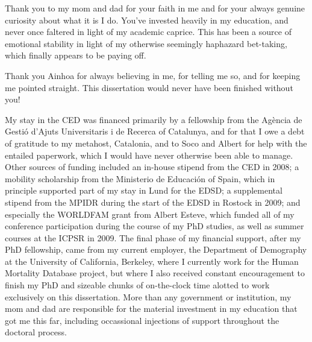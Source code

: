 Thank you to my mom and dad for your faith in me and for your always genuine
curiosity about what it is I do. You've invested heavily in my education, and never once
faltered in light of my academic caprice. This has been a source of emotional
stability in light of my otherwise seemingly haphazard bet-taking, which finally
appears to be paying off.

Thank you Ainhoa for always believing in me, for telling me so, and for keeping
me pointed straight. This dissertation would never have been finished without
you!

My stay in the CED was financed primarily by a
fellowship from the Ag\`{e}ncia de Gesti\'{o} d'Ajuts Universitaris i de Recerca
of Catalunya, and for that I owe a debt of gratitude to my metahost, Catalonia,
and to Soco and Albert for help with the entailed paperwork, which I
would have never otherwise been able to manage. Other sources of funding
included an in-house stipend from the CED in 2008; a mobility scholarship 
from the Ministerio de Educaci\'{o}n of Spain, which in principle supported 
part of my stay in Lund for the EDSD; a supplemental stipend from the
MPIDR during the start of the EDSD in Rostock in 2009; and especially the
WORLDFAM grant from Albert Esteve, which funded all of my conference
participation during the course of my PhD studies, as well as summer courses at
the ICPSR in 2009. The final phase of my financial support, after my PhD fellowship, came from my current employer, the Department of
Demography at the University of California, Berkeley, where I currently work for
the Human Mortality Database project, but where I also received constant encouragement to finish my PhD and
sizeable chunks of on-the-clock time alotted to work exclusively on this
dissertation. More than any government or institution, my mom
and dad are responsible for the material investment in my education that got me this far,
including occassional injections of support throughout the doctoral process.






